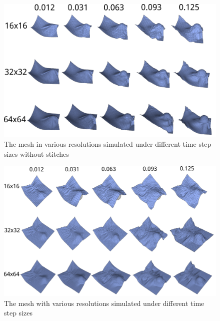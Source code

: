 \documentclass[a4paper,10pt]{article}
\begin{document}
\begin{figure}
 \centering
 \includegraphics[scale=0.45]{img/without_stitch.png}
 \caption{The mesh in various resolutions simulated under different time step sizes without stitches}
 \label{fig:nostitch}
\end{figure}

\begin{figure}
 \centering
 \includegraphics[scale=0.32]{img/with_stitch.png}
 \caption{The mesh with various resolutions simulated under different time step sizes}
 \label{fig:stitch}
\end{figure}
\end{document}
